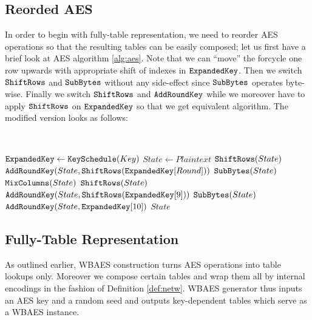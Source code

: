 
\subsection{Reorded AES}

In order to begin with fully-table representation, we need to reorder AES operations so that the resulting tables can be easily composed; let us first have a brief look at AES algorithm \ref{alg:aes}. Note that we can ``move'' the forcycle one row upwards with appropriate shift of indexes in $\texttt{ExpandedKey}$. Then we switch $\texttt{ShiftRows}$ and $\texttt{SubBytes}$ without any side-effect since $\texttt{SubBytes}$ operates byte-wise. Finally we switch $\texttt{ShiftRows}$ and $\texttt{AddRoundKey}$ while we moreover have to apply $\texttt{ShiftRows}$ on $\texttt{ExpandedKey}$ so that we get equivalent algorithm. The modified version looks as follows:
\begin{alg}
\label{alg:reordaes}
	~
	\begin{algorithmic}[1]
			\State $\texttt{ExpandedKey} \gets \texttt{KeySchedule}(Key)$
			\State $State \gets Plaintext$
				\State $\texttt{ShiftRows}(State)$
				\State $\texttt{AddRoundKey}(State, \texttt{ShiftRows}(\texttt{ExpandedKey}[Round]))$
				\State $\texttt{SubBytes}(State)$
				\State $\texttt{MixColumns}(State)$
			\EndFor
			\State $\texttt{ShiftRows}(State)$
			\State $\texttt{AddRoundKey}(State, \texttt{ShiftRows}(\texttt{ExpandedKey}[9]))$
			\State $\texttt{SubBytes}(State)$
			\State $\texttt{AddRoundKey}(State, \texttt{ExpandedKey}[10])$
			\State\Return $State$
		\EndFunction
	\end{algorithmic}
\end{alg}



\subsection{Fully-Table Representation}

As outlined earlier, WBAES construction turns AES operations into table lookups only. Moreover we compose certain tables and wrap them all by internal encodings in the fashion of Definition \ref{def:netw}. WBAES generator thus inputs an AES key and a random seed and outputs key-dependent tables which serve as a WBAES instance.

